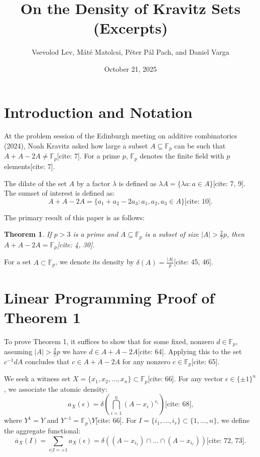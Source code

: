 \documentclass{article}
\title{On the Density of Kravitz Sets (Excerpts)}
\author{Vsevolod Lev, Máté Matolcsi, Péter Pál Pach, and Daniel Varga}
\date{October 21, 2025}
\newtheorem{theorem}{Theorem}
\begin{document}
\maketitle

\section{Introduction and Notation}
At the problem session of the Edinburgh meeting on additive combinatorics (2024), Noah Kravitz asked how large a subset $A \subseteq \mathbb{F}_{p}$ can be such that $A+A-2A \ne \mathbb{F}_{p}$[cite: 7]. For a prime $p$, $\mathbb{F}_{p}$ denotes the finite field with $p$ elements[cite: 7]. 

The dilate of the set $A$ by a factor $\lambda$ is defined as $\lambda A = \{\lambda a : a \in A\}$[cite: 7, 9]. The sumset of interest is defined as:
\begin{equation}
    A+A-2A = \{a_{1} + a_{2} - 2a_{3} : a_{1}, a_{2}, a_{3} \in A\} \text{[cite: 10].}
\end{equation}

The primary result of this paper is as follows:
\begin{theorem}
If $p > 3$ is a prime and $A \subseteq \mathbb{F}_{p}$ is a subset of size $|A| > \frac{2}{7}p$, then $A+A-2A = \mathbb{F}_{p}$[cite: 4, 30].
\end{theorem}

For a set $A \subset \mathbb{F}_{p}$, we denote its density by $\delta(A) = \frac{|A|}{p}$[cite: 45, 46].

\section{Linear Programming Proof of Theorem 1}
To prove Theorem 1, it suffices to show that for some fixed, nonzero $d \in \mathbb{F}_{p}$, assuming $|A| > \frac{2}{7}p$ we have $d \in A+A-2A$[cite: 64]. Applying this to the set $c^{-1}dA$ concludes that $c \in A+A-2A$ for any nonzero $c \in \mathbb{F}_{p}$[cite: 65].

We seek a witness set $X = \{x_{1}, x_{2}, \dots, x_{n}\} \subset \mathbb{F}_{p}$[cite: 66]. For any vector $\epsilon \in \{\pm 1\}^{n}$, we associate the atomic density:
\begin{equation}
    a_{X}(\epsilon) = \delta \left( \bigcap_{i=1}^{n} (A - x_{i})^{\epsilon_{i}} \right) \text{[cite: 68],}
\end{equation}
where $Y^{1} = Y$ and $Y^{-1} = \mathbb{F}_{p} \setminus Y$[cite: 66]. For $I = \{i_{1}, \dots, i_{r}\} \subset \{1, \dots, n\}$, we define the aggregate functional:
\begin{equation}
    \overline{a}_{X}(I) = \sum_{\epsilon|I=+1} a_{X}(\epsilon) = \delta((A - x_{i_{1}}) \cap \dots \cap (A - x_{i_{r}})) \text{[cite: 72, 73].}
\end{equation}
\end{document}
